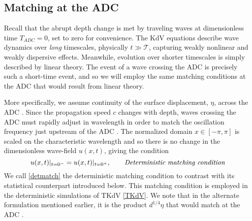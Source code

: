 \documentclass[11pt]{article}
\newcommand{\depth}{d}
\newcommand{\timescale}{\mathcal{T}}
\begin{document}
\subsection{Matching at the ADC}

	Recall that the abrupt depth change is met by traveling waves at dimensionless time $T_{ADC} = 0$, set to zero for convenience. The KdV equations describe wave dynamics over {\em long} timescales, physically $t \gg \timescale$, capturing weakly nonlinear and weakly dispersive effects. Meanwhile, evolution over shorter timescales is simply described by linear theory. The event of a wave crossing the ADC is precisely such a short-time event, and so we will employ the same matching conditions at the ADC that would result from linear theory. 

	More specifically, we assume continuity of the surface displacement, $\eta$, across the ADC \cite{whitham2011linear, rey1992propagation}. Since the propagation speed $c$ changes with depth, waves crossing the ADC must rapidly adjust in wavelength in order to match the oscillation frequency just upstream of the ADC \cite{whitham2011linear, rey1992propagation}. The normalized domain $x \in [-\pi,\pi]$ is scaled on the characteristic wavelength and so there is no change in the dimensionless wave-field $u(x,t)$, giving the condition
\begin{equation}
\label{detmatch}
u(x,t) \vert_{t=0^-} = u(x,t) \vert_{t=0^+}, 
\qquad \mbox{\em Deterministic matching condition}
\end{equation}	
We call \eqref{detmatch} the deterministic matching condition to contrast with its statistical counterpart introduced below. This matching condition is employed in the deterministic simulations of TKdV \eqref{TKdV}. We note that in the alternate formulation mentioned earlier, it is the product $\depth^{1/4} \eta$ that would match at the ADC \cite{johnson1997modern}.
\end{document}

